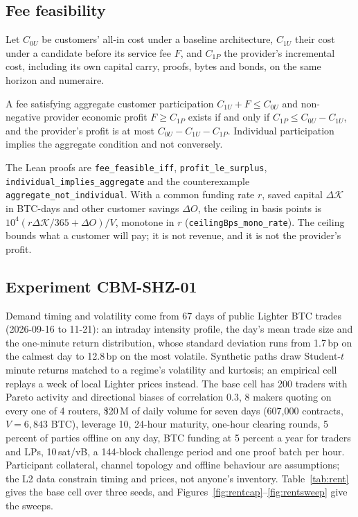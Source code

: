 \subsection{Fee feasibility}
\label{sec:rent-fee}

Let $C_{0U}$ be customers' all-in cost under a baseline architecture, $C_{1U}$ their cost under a candidate before its service fee $F$, and $C_{1P}$ the provider's incremental cost, including its own capital carry, proofs, bytes and bonds, on the same horizon and numeraire.

\begin{proposition}
\label{prop:fee}
A fee satisfying aggregate customer participation $C_{1U}+F\le C_{0U}$ and non-negative provider economic profit $F\ge C_{1P}$ exists if and only if $C_{1P}\le C_{0U}-C_{1U}$, and the provider's profit is at most $C_{0U}-C_{1U}-C_{1P}$. Individual participation implies the aggregate condition and not conversely.
\end{proposition}

The Lean proofs are \texttt{fee\_\allowbreak{}feasible\_\allowbreak{}iff}, \texttt{profit\_\allowbreak{}le\_\allowbreak{}surplus}, \texttt{individual\_\allowbreak{}implies\_\allowbreak{}aggregate} and the counterexample \texttt{aggregate\_\allowbreak{}not\_\allowbreak{}individual}. With a common funding rate $r$, saved capital $\Delta\mathcal K$ in BTC-days and other customer savings $\Delta O$, the ceiling in basis points is $10^4(r\Delta\mathcal K/365+\Delta O)/V$, monotone in $r$ (\texttt{ceilingBps\_\allowbreak{}mono\_\allowbreak{}rate}). The ceiling bounds what a customer will pay; it is not revenue, and it is not the provider's profit.

\subsection{Experiment CBM-SHZ-01}
\label{sec:rent-exp}

Demand timing and volatility come from 67 days of public Lighter BTC trades (2026-09-16 to 11-21): an intraday intensity profile, the day's mean trade size and the one-minute return distribution, whose standard deviation runs from 1.7\,bp on the calmest day to 12.8\,bp on the most volatile. Synthetic paths draw Student-$t$ minute returns matched to a regime's volatility and kurtosis; an empirical cell replays a week of local Lighter prices instead. The base cell has 200 traders with Pareto activity and directional biases of correlation $0.3$, 8 makers quoting on every one of 4 routers, \$20\,M of daily volume for seven days (607{,}000 contracts, $V=6{,}843$ BTC), leverage 10, 24-hour maturity, one-hour clearing rounds, 5 percent of parties offline on any day, BTC funding at 5 percent a year for traders and LPs, 10\,sat/vB, a 144-block challenge period and one proof batch per hour. Participant collateral, channel topology and offline behaviour are assumptions; the L2 data constrain timing and prices, not anyone's inventory. Table~\ref{tab:rent} gives the base cell over three seeds, and Figures~\ref{fig:rentcap}--\ref{fig:rentsweep} give the sweeps.

